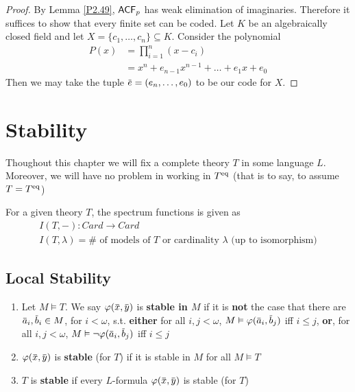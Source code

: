 \documentclass[11pt]{article}
\begin{document}
\begin{proof}
By Lemma \ref{P2.49}, \(\textsf{ACF}_p\) has weak elimination of imaginaries. Therefore it suffices to
show that every finite set can be coded. Let \(K\) be an algebraically closed field and
let \(X=\{c_1,\dots,c_n\}\subseteq K\). Consider the polynomial
\begin{align*}
P(x)&=\prod_{i=1}^n(x-c_i)\\
&=x^n+e_{n-1}x^{n-1}+\dots+e_1x+e_0
\end{align*}
Then we may take the tuple \(\bare=(e_n,\dots,e_0)\) to be our code for \(X\).
\end{proof}

\section{Stability}
\label{sec:org683a875}
Thoughout this chapter we will fix a complete theory \(T\) in some language \(L\). Moreover, we
will have no problem in working in \(T^{\operatorname{eq}}\) (that is to say, to assume \(T=T^{\operatorname{eq}}\))

For a given theory \(T\), the spectrum functions is given as
\begin{gather*}
I(T,-):Card\to Card\\
I(T,\lambda)=\#\text{ of models of \(T\) or cardinality $\lambda$ (up to isomorphism)}
\end{gather*}

\subsection{Local Stability}
\label{sec:org2f1f951}
\begin{definition}[]
\begin{enumerate}
\item Let \(M\vDash T\). We say \(\varphi(\barx,\bary)\) is \textbf{stable in \(M\)} if it is \textbf{not} the case that there
are \(\bara_i,\barb_i\in M\), for \(i<\omega\), s.t. \textbf{either} for all \(i,j<\omega\), \(M\vDash\varphi(\bara_i,\barb_j)\)
iff \(i\le j\), \textbf{or}, for all \(i,j<\omega\), \(M\vDash\neg\varphi(\bara_i,\barb_j)\) iff \(i\le j\)
\item \(\varphi(\barx,\bary)\) is \textbf{stable} (for \(T\)) if it is stable in \(M\) for all \(M\vDash T\)
\item \(T\) is \textbf{stable} if every \(L\)-formula \(\varphi(\barx,\bary)\) is stable (for \(T\))
\end{enumerate}
\end{definition}
\end{document}
